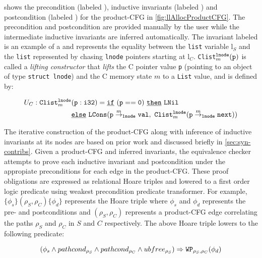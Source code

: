  shows the precondition (labeled ),
inductive invariants (labeled ) and postcondition (labeled )
for the product-CFG in \cref{fig:llAllocProductCFG}. The precondition and postcondition are
provided manually by the user while the intermediate inductive invariants are inferred automatically.
The invariant labeled  is an example of a \recursiveRelation{} and represents
the equality between the \SpecL{} {\tt list} variable l$_S$ and the {\tt list} represented by
chasing {\tt lnode} pointers starting at l$_C$.
{\tt Clist}$^{{\tt lnode}}_m({\tt p})$ is called a {\em lifting constructor} that {\em lifts}
the C pointer value {\tt p} (pointing to an object of type {\tt struct lnode}) and the C
memory state $m$ to a \SpecL{} {\tt List} value, and is defined by:
\begin{small}
\begin{equation}\label{eqn:clist}
\begin{split}
U_C: \mathrm{\tt Clist}^{{\tt lnode}}_m&\mathrm{\tt (p:i32)} = \mathrm{\tt \underline{if}\ (p==0)}\ \mathrm{\tt \underline{then}\ }{\tt LNil} \\
                                                         & \mathrm{\tt \underline{else}\ {\tt LCons}(}{\tt p} \overset{m}{\rightarrow}_{{\tt lnode}} {\tt val},\ {\tt Clist}_m^{\tt lnode}({\tt p} \overset{m}{\rightarrow}_{{\tt lnode}} {\tt next}))
\end{split}
\end{equation}
\end{small}
The iterative construction of the product-CFG along with inference of inductive invariants at its nodes are based on
prior work \cite{oopsla20} and discussed briefly in \cref{sec:syn-contribs}. Given a product-CFG
and inferred invariants, the equivalence checker attempts to prove each inductive invariant and
postcondition under the appropiate preconditions for each edge in the product-CFG. These proof
obligations are expressed as relational Hoare triples \cite{relationalHoareLogic,hoareTriple}
and lowered to a first order logic predicate using weakest precondition predicate transformer.
For example, $\{\phi_s\} (\rho_S,\rho_C) \{\phi_d\}$
represents the Hoare triple where $\phi_s$ and $\phi_d$ represents the pre- and postconditions
and $(\rho_S,\rho_C)$ represents a product-CFG edge correlating the paths $\rho_S$ and $\rho_C$
in $S$ and $C$ respectively. The above Hoare triple lowers to the following predicate:
\begin{small}
\begin{equation}\label{eqn:firstOrderFormula}
(\phi_s \land pathcond_{\rho_S} \land pathcond_{\rho_C} \land ubfree_{\rho_S}) \Rightarrow {\tt WP}_{{\rho_S,\rho_C}}(\phi_d)
\end{equation}
\end{small}

